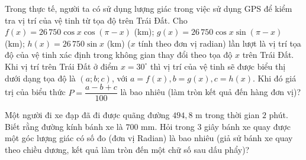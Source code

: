 \begin{ex}%
	Trong thực tế, người ta có sử dụng lượng giác trong việc sử dụng GPS để kiểm tra vị trí của vệ tinh từ tọa độ trên Trái Đất. Cho $ f(x) = 26\,750 \cos x\cos(\pi-x)$ (km); $g(x)=26\,750\cos x\sin(\pi-x)$ (km); $h(x)=26\,750\sin x$ (km) ($x$ tính theo đơn vị radian) lần lượt là vị trí tọa độ của vệ tinh xác định trong không gian thay đổi theo tọa độ $x$ trên Trái Đất. Khi vị trí trên Trái Đất ở điểm $x=30^\circ$ thì vị trí của vệ tinh sẽ được biểu thị dưới dạng tọa độ là $(a;b;c)$, với $a=f(x),b=g(x),c=h(x)$. Khi đó giá trị của biểu thức $P=\dfrac{a-b+c}{100}$ là bao nhiêu (làm tròn kết quả đến hàng đơn  vị)?
\end{ex}

\begin{ex}%
	Một người đi xe đạp đã đi được quãng đường $494{,}8$ m trong thời gian $2$ phút. Biết rằng đường kính bánh xe là $700$ mm. Hỏi trong $3$ giây bánh xe quay được  một góc lượng giác có số đo (đơn vị Radian) là bao nhiêu (giả sử bánh xe quay theo chiều dương, kết quả làm tròn đến một chữ số sau dấu phẩy)?
\end{ex}

